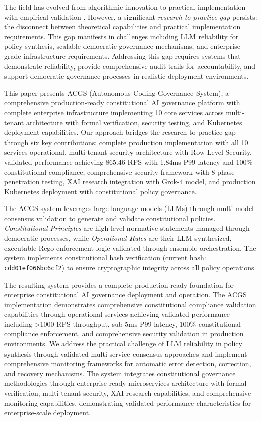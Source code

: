 \documentclass[manuscript,screen,9pt]{acmart}
\begin{document}
The field has evolved from algorithmic innovation to practical implementation with empirical validation \cite{StanfordJBLP2024AIGovernanceWeb3, StanfordLaw2025BulletProof}. However, a significant \textit{research-to-practice gap} persists: the disconnect between theoretical capabilities and practical implementation requirements. This gap manifests in challenges including LLM reliability for policy synthesis, scalable democratic governance mechanisms, and enterprise-grade infrastructure requirements. Addressing this gap requires systems that demonstrate reliability, provide comprehensive audit trails for accountability, and support democratic governance processes in realistic deployment environments.

This paper presents ACGS (Autonomous Coding Governance System), a comprehensive production-ready constitutional AI governance platform with complete enterprise infrastructure implementing 10 core services across multi-tenant architecture with formal verification, security testing, and Kubernetes deployment capabilities. Our approach bridges the research-to-practice gap through six key contributions: complete production implementation with all 10 services operational, multi-tenant security architecture with Row-Level Security, validated performance achieving 865.46 RPS with 1.84ms P99 latency and 100\% constitutional compliance, comprehensive security framework with 8-phase penetration testing, XAI research integration with Grok-4 model, and production Kubernetes deployment with constitutional policy governance.

The ACGS system leverages large language models (LLMs) through multi-model consensus validation to generate and validate constitutional policies. \textit{Constitutional Principles} are high-level normative statements managed through democratic processes, while \textit{Operational Rules} are their LLM-synthesized, executable Rego enforcement logic validated through ensemble orchestration. The system implements constitutional hash verification (current hash: \texttt{\small{cdd01ef066bc6cf2}}) to ensure cryptographic integrity across all policy operations.

The resulting system provides a complete production-ready foundation for enterprise constitutional AI governance deployment and operation. The ACGS implementation demonstrates comprehensive constitutional compliance validation capabilities through operational services achieving validated performance including >1000 RPS throughput, sub-5ms P99 latency, 100\% constitutional compliance enforcement, and comprehensive security validation in production environments. We address the practical challenge of LLM reliability in policy synthesis through validated multi-service consensus approaches and implement comprehensive monitoring frameworks for automatic error detection, correction, and recovery mechanisms. The system integrates constitutional governance methodologies through enterprise-ready microservices architecture with formal verification, multi-tenant security, XAI research capabilities, and comprehensive monitoring capabilities, demonstrating validated performance characteristics for enterprise-scale deployment.
\end{document}
